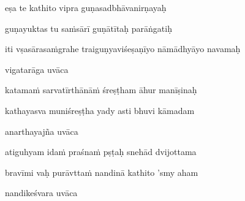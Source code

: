 eṣa te kathito vipra guṇasadbhāvanirṇayaḥ\thinspace{\dandab} \dontdisplaylinenum

guṇayuktas tu saṁsārī guṇātītaḥ parāṅgatiḥ \veg\dontdisplaylinenum


\jump
\begin{center}
\ketdanda iti vṣasārasaṁgrahe traiguṇyaviśeṣaṇīyo nāmādhyāyo navamaḥ\ketdanda
\end{center}
\dontdisplaylinenum\vers 
{}
\bekveg\szamveg\vfill\phpspagebreak\szam\bek{}
\thispagestyle{empty}



\jump\jump

\vers

vigatarāga uvāca~{\dandab}\dontdisplaylinenum 

katamaṁ sarvatīrthānāṁ śreṣṭham āhur manīṣinaḥ\thinspace{\danda} \dontdisplaylinenum

kathayasva muniśreṣṭha yady asti bhuvi kāmadam \veg\dontdisplaylinenum
{}

anarthayajña uvāca~{\dandab}\dontdisplaylinenum 

atiguhyam idaṁ praśnaṁ pṣṭaḥ snehād dvijottama\thinspace{\danda} \dontdisplaylinenum

bravīmi vaḥ purāvttaṁ nandinā kathito 'smy aham \veg\dontdisplaylinenum
{}

nandikeśvara uvāca~{\dandab}\dontdisplaylinenum 
{}

